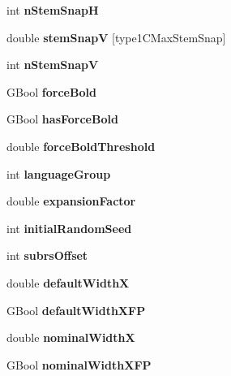 \begin{DoxyCompactItemize}
int {\bfseries n\+Stem\+SnapH}
\item 
\mbox{\label{struct_type1_c_private_dict_aa1c59dc113dbe25b07b488ba6e73f022}} 
double {\bfseries stem\+SnapV} \mbox{[}type1\+C\+Max\+Stem\+Snap\mbox{]}
\item 
\mbox{\label{struct_type1_c_private_dict_a0b65fd3947091f140edf4750a3fe4223}} 
int {\bfseries n\+Stem\+SnapV}
\item 
\mbox{\label{struct_type1_c_private_dict_a78f08f7e4c908e2af4a6b75fce67ecae}} 
G\+Bool {\bfseries force\+Bold}
\item 
\mbox{\label{struct_type1_c_private_dict_a5f3adcc83c2133d0d4195cba70644682}} 
G\+Bool {\bfseries has\+Force\+Bold}
\item 
\mbox{\label{struct_type1_c_private_dict_ad2dd9d1219a4f47f8bdc5c52b134bac8}} 
double {\bfseries force\+Bold\+Threshold}
\item 
\mbox{\label{struct_type1_c_private_dict_a62543826a0bd1ee286332739220ae8ae}} 
int {\bfseries language\+Group}
\item 
\mbox{\label{struct_type1_c_private_dict_a16e6f2f3f1519fff25909f1ea7bce15c}} 
double {\bfseries expansion\+Factor}
\item 
\mbox{\label{struct_type1_c_private_dict_a8ee6e01f234b437d3272805cd5dd615c}} 
int {\bfseries initial\+Random\+Seed}
\item 
\mbox{\label{struct_type1_c_private_dict_a0f9cabd2689303183c2f93eae4265133}} 
int {\bfseries subrs\+Offset}
\item 
\mbox{\label{struct_type1_c_private_dict_a1397712219ae114687f8e16dd43132d4}} 
double {\bfseries default\+WidthX}
\item 
\mbox{\label{struct_type1_c_private_dict_a458feb3098d3fbb3992cbdf0fa5a8c73}} 
G\+Bool {\bfseries default\+Width\+X\+FP}
\item 
\mbox{\label{struct_type1_c_private_dict_aa781ce9d51bcc8b15bce367a5bf89fe8}} 
double {\bfseries nominal\+WidthX}
\item 
\mbox{\label{struct_type1_c_private_dict_a827a84af99cd3ae6bf601bbd9d8636c5}} 
G\+Bool {\bfseries nominal\+Width\+X\+FP}
\end{DoxyCompactItemize}


